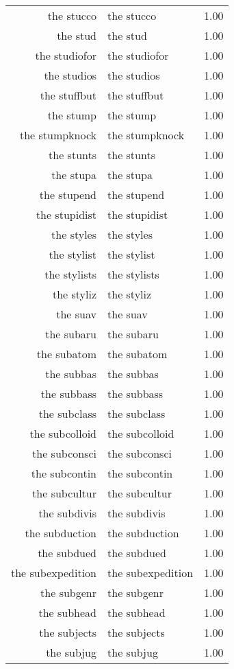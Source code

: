 \begin{table}[ht]
\begin{tabular}{rlr}
  the stucco & the stucco & 1.00 \\ 
  the stud & the stud & 1.00 \\ 
  the studiofor & the studiofor & 1.00 \\ 
  the studios & the studios & 1.00 \\ 
  the stuffbut & the stuffbut & 1.00 \\ 
  the stump & the stump & 1.00 \\ 
  the stumpknock & the stumpknock & 1.00 \\ 
  the stunts & the stunts & 1.00 \\ 
  the stupa & the stupa & 1.00 \\ 
  the stupend & the stupend & 1.00 \\ 
  the stupidist & the stupidist & 1.00 \\ 
  the styles & the styles & 1.00 \\ 
  the stylist & the stylist & 1.00 \\ 
  the stylists & the stylists & 1.00 \\ 
  the styliz & the styliz & 1.00 \\ 
  the suav & the suav & 1.00 \\ 
  the subaru & the subaru & 1.00 \\ 
  the subatom & the subatom & 1.00 \\ 
  the subbas & the subbas & 1.00 \\ 
  the subbass & the subbass & 1.00 \\ 
  the subclass & the subclass & 1.00 \\ 
  the subcolloid & the subcolloid & 1.00 \\ 
  the subconsci & the subconsci & 1.00 \\ 
  the subcontin & the subcontin & 1.00 \\ 
  the subcultur & the subcultur & 1.00 \\ 
  the subdivis & the subdivis & 1.00 \\ 
  the subduction & the subduction & 1.00 \\ 
  the subdued & the subdued & 1.00 \\ 
  the subexpedition & the subexpedition & 1.00 \\ 
  the subgenr & the subgenr & 1.00 \\ 
  the subhead & the subhead & 1.00 \\ 
  the subjects & the subjects & 1.00 \\ 
  the subjug & the subjug & 1.00 \\ 

\end{tabular}
\end{table}
